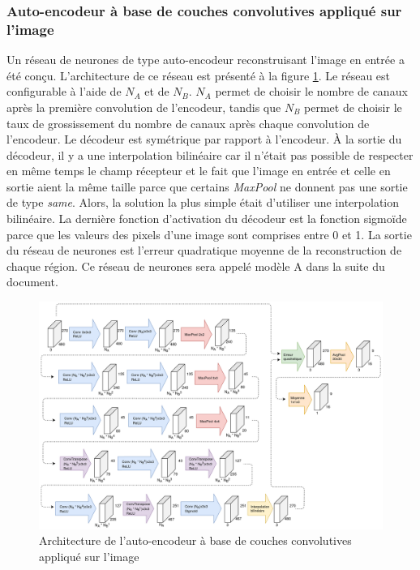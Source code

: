 \subsubsection{Auto-encodeur à base de couches convolutives appliqué sur l'image}
    Un réseau de neurones de type auto-encodeur reconstruisant l'image en entrée a été conçu. L'architecture de ce réseau est présenté à la figure \ref{fig:architecture_cnn_autoencoder}. Le réseau est configurable à l'aide de \(N_A\) et de \(N_B\). \(N_A\) permet de choisir le nombre de canaux après la première convolution de l'encodeur, tandis que \(N_B\) permet de choisir le taux de grossissement du nombre de canaux après chaque convolution de l'encodeur. Le décodeur est symétrique par rapport à l'encodeur. À la sortie du décodeur, il y a une interpolation bilinéaire car il n'était pas possible de respecter en même temps le champ récepteur et le fait que l'image en entrée et celle en sortie aient la même taille parce que certains \textit{MaxPool} ne donnent pas une sortie de type \textit{same}. Alors, la solution la plus simple était d'utiliser une interpolation bilinéaire. La dernière fonction d'activation du décodeur est la fonction sigmoïde parce que les valeurs des pixels d'une image sont comprises entre 0 et 1. La sortie du réseau de neurones est l'erreur quadratique moyenne de la reconstruction de chaque région. Ce réseau de neurones sera appelé modèle A dans la suite du document.
    \begin{figure}
        \centering
        \includegraphics[width=16.6cm]{images/Architecture_CnnAutoencoder.png}
        \caption{Architecture de l'auto-encodeur à base de couches convolutives appliqué sur l'image}
        \label{fig:architecture_cnn_autoencoder}
    \end{figure}

